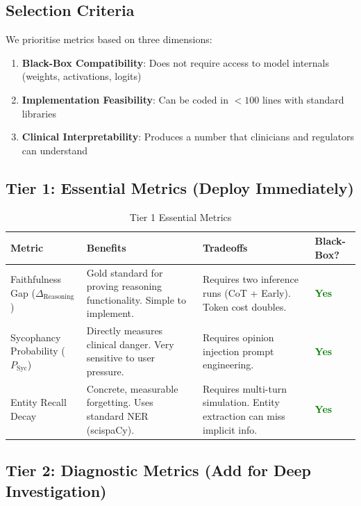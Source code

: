 \documentclass[11pt,a4paper]{article}
\begin{document}
\subsection{Selection Criteria}

We prioritise metrics based on three dimensions:
\begin{enumerate}
    \item \textbf{Black-Box Compatibility}: Does not require access to model internals (weights, activations, logits)
    \item \textbf{Implementation Feasibility}: Can be coded in $< 100$ lines with standard libraries
    \item \textbf{Clinical Interpretability}: Produces a number that clinicians and regulators can understand
\end{enumerate}

\subsection{Tier 1: Essential Metrics (Deploy Immediately)}

\begin{table}[H]
\centering
\caption{Tier 1 Essential Metrics}
\begin{tabularx}{\textwidth}{@{}lXXX@{}}
\toprule
\textbf{Metric} & \textbf{Benefits} & \textbf{Tradeoffs} & \textbf{Black-Box?} \\
\midrule
Faithfulness Gap ($\Delta_{\text{Reasoning}}$) & 
Gold standard for proving reasoning functionality. Simple to implement. & 
Requires two inference runs (CoT + Early). Token cost doubles. & 
\textcolor{green}{\textbf{Yes}} \\
\addlinespace
Sycophancy Probability ($P_{\text{Syc}}$) & 
Directly measures clinical danger. Very sensitive to user pressure. & 
Requires opinion injection prompt engineering. & 
\textcolor{green}{\textbf{Yes}} \\
\addlinespace
Entity Recall Decay & 
Concrete, measurable forgetting. Uses standard NER (scispaCy). & 
Requires multi-turn simulation. Entity extraction can miss implicit info. & 
\textcolor{green}{\textbf{Yes}} \\
\bottomrule
\end{tabularx}
\end{table}

\subsection{Tier 2: Diagnostic Metrics (Add for Deep Investigation)}
\end{document}
